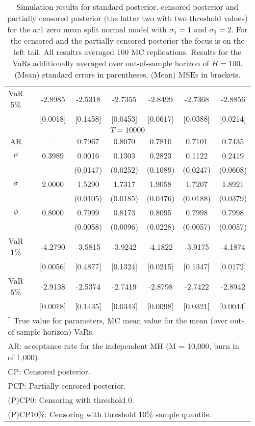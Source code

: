 {\begin{table}
\begin{tabular}{cc cccccc}
VaR 5\% && -2.8985 & -2.5318 & -2.7355 & -2.8499 & -2.7368 & -2.8856 \\ 
 && [0.0018] & [0.1458] & [0.0453] & [0.0617] & [0.0388] & [0.0214] \\ 
\hline 
\multicolumn{8}{c}{$T =10000$}  \\ 
\hline 
AR && -- & 0.7967 & 0.8070 & 0.7810 & 0.7101 & 0.7435 \\  
$\mu$&& 0.3989 & 0.0016 & 0.1303 & 0.2823 & 0.1122 & 0.2419 \\ 
&&   & (0.0147) & (0.0252) & (0.1089) & (0.0247) & (0.0608) \\ 
$\sigma$&& 2.0000 & 1.5290 & 1.7317 & 1.9058 & 1.7207 & 1.8921 \\ 
&&   & (0.0105) & (0.0185) & (0.0476) & (0.0188) & (0.0379) \\ 
$\phi$&& 0.8000 & 0.7999 & 0.8173 & 0.8095 & 0.7998 & 0.7998 \\ 
&&   & (0.0058) & (0.0096) & (0.0228) & (0.0057) & (0.0057) \\ 
VaR 1\% && -4.2790 & -3.5815 & -3.9242 & -4.1822 & -3.9175 & -4.1874 \\ 
  && [0.0056] & [0.4877] & [0.1324] & [0.0215] & [0.1347] & [0.0172] \\ 
VaR 5\% && -2.9138 & -2.5374 & -2.7419 & -2.8798 & -2.7422 & -2.8942 \\ 
 && [0.0018] & [0.1435] & [0.0343] & [0.0098] & [0.0321] & [0.0044] \\ 
\hline 
\multicolumn{8}{l}{\footnotesize{$^*$ True value for parameters, MC mean value for the mean (over out-of-sample horizon) VaRs.}}  \\ 
\multicolumn{8}{l}{\footnotesize{AR: acceptance rate for the independent MH (M = 10,000, burn in of 1,000).}}  \\ 
\multicolumn{8}{l}{\footnotesize{CP: Censored posterior.}}  \\ 
\multicolumn{8}{l}{\footnotesize{PCP: Partially censored posterior.}} \\ 
\multicolumn{8}{l}{\footnotesize{(P)CP0: Censoring with threshold 0.}} \\ 
\multicolumn{8}{l}{\footnotesize{(P)CP10\%: Censoring with threshold 10\% sample quantile.}}  \\ 
\end{tabular}
 \caption{Simulation results for standard posterior, censored posterior and partially censored posterior (the latter two with two threshold values) for the ar1 zero mean split normal model with $\sigma_{1} = 1$ and $\sigma_{2} = 2$. For the censored and the partially censored posterior the focus is on the left tail. All resultrs averaged 100 MC replications. Results for the VaRs additionally averaged over out-of-sample horizon of $H=100$. (Mean) standard errors in parentheses, (Mean) MSEs in brackets.} 
\label{tab:ar1_pcp}  
\end{table}
}
